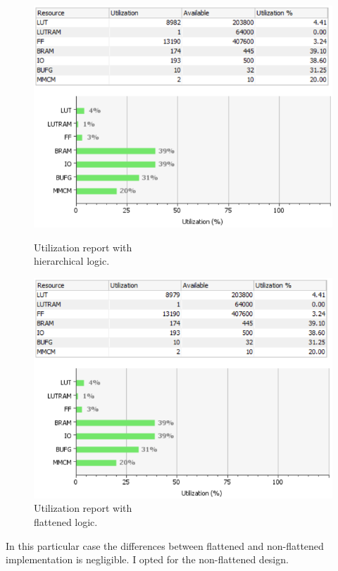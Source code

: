 \begin{figure}[H]
	\centering
	\begin{minipage}{.5\textwidth}
		\centering
		\includegraphics[width=.99\linewidth]{IMG/ch4/FirmwareNOFLAT/UTILIZATION}
		\caption{Utilization report with \\hierarchical logic.}
		\label{fig:noflatutilization}
	\end{minipage}%
	\begin{minipage}{.5\textwidth}
		\centering
		\includegraphics[width=.99\linewidth]{IMG/ch4/FirmwareFLAT/UTILIZATION}
		\caption{Utilization report with \\flattened logic.}
		\label{fig:flatutilization}
	\end{minipage}
\end{figure}
\noindent In this particular case the differences between flattened and non-flattened implementation is negligible. I opted for the non-flattened design.


